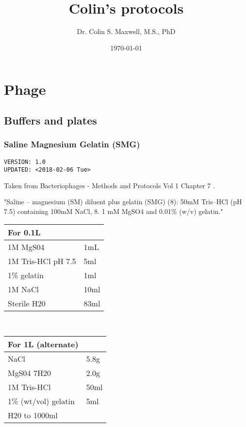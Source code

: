 \documentclass[11pt]{article}
\author{Dr. Colin S. Maxwell, M.S., PhD}
\date{\today}
\title{Colin's protocols}
\begin{document}
\maketitle
\tableofcontents


\section{Phage}
\label{sec:org618ca55}
\subsection{Buffers and plates}
\label{sec:org449cdad}
\subsubsection[\label{org652d648} Saline Magnesium Gelatin (SMG)]{\label{org0968196} Saline Magnesium Gelatin (SMG)}
\label{sec:org21d15d3}
\begin{verbatim}
VERSION: 1.0
UPDATED: <2018-02-06 Tue>
\end{verbatim}

Taken from Bacteriophages - Methods and Protocols Vol 1 Chapter 7 \cite{kropinski2009enumeration}.

"Saline – magnesium (SM) diluent plus gelatin (SMG) (8): 50mM Tris–HCl
(pH 7.5) containing 100mM NaCl, 8. 1 mM MgSO4 and 0.01\% (w/v)
gelatin."

\begin{center}
\begin{tabular}{ll}
For 0.1L & \\
\hline
1M MgS04 & 1mL\\
1M Tris-HCl pH 7.5 & 5ml\\
1\% gelatin & 1ml\\
1M NaCl & 10ml\\
Sterile H20 & 83ml\\
\end{tabular}
\end{center}

\\

\begin{center}
\begin{tabular}{ll}
For 1L (alternate) & \\
\hline
NaCl & 5.8g\\
MgS04 7H20 & 2.0g\\
1M Tris-HCl & 50ml\\
1\% (wt/vol) gelatin & 5ml\\
H20 to 1000ml & \\
\end{tabular}
\end{center}
\end{document}
